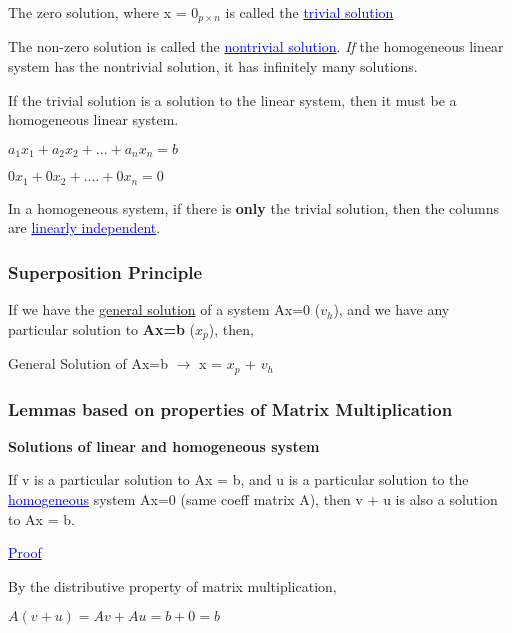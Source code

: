 \documentclass{article}
\newcommand{\bul}[1]{\textcolor{blue}{\underline{#1}}}
\begin{document}
\vspace{10pt}

The zero solution, where x = $0_{p\times n}$ is called the \bul{trivial solution}

\vspace{10pt}

The non-zero solution is called the \bul{nontrivial solution}. \textit{If} the homogeneous linear system has the nontrivial solution, it has infinitely many solutions.

\vspace{10pt}

If the trivial solution is a solution to the linear system, then it must be a homogeneous linear system.
\begin{center}
    $a_1x_1 + a_2x_2 + ... + a_nx_n = b$

    $0x_1 + 0x_2 + .... + 0x_n = 0$
\end{center}

In a homogeneous system, if there is \textbf{only} the trivial solution, then the columns are \bul{linearly independent}.

\subsubsection{Superposition Principle}
If we have the \underline{general solution} of a system Ax=0 ($v_h$), and we have any particular solution to \textbf{Ax=b} ($x_p$), then,
\begin{center}
    General Solution of Ax=b $\rightarrow$ x = $x_p$ + $v_h$
\end{center}

\subsubsection{Lemmas based on properties of Matrix Multiplication}

\vspace{10pt}

\textbf{Solutions of linear and homogeneous system}

If v is a particular solution to Ax = b, and u is a particular solution to the \bul{homogeneous} system Ax=0 (same coeff matrix A), then v + u is also a solution to Ax = b.

\vspace{10pt}

\bul{Proof}

By the distributive property of matrix multiplication,
\begin{center}
    \begin{math}
        A(v+u) = Av + Au = b + 0 = b
    \end{math}
\end{center}
\end{document}
